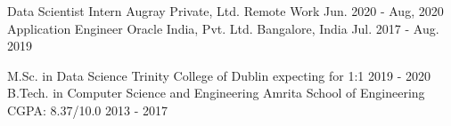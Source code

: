\documentclass[12pt, a4paper]{awesome-cv}
\begin{document}
\begin{cventries}
\cventry
    {Data Scientist Intern}
    {Augray Private, Ltd.}
    {Remote Work}
    {Jun. 2020 - Aug, 2020}
    {}
\cventry
    {Application Engineer}
    {Oracle India, Pvt. Ltd.}
    {Bangalore, India}
{Jul. 2017 - Aug. 2019}
    {}
\end{cventries}

\begin{cventries}
  \cventry
    {M.Sc. in Data Science}
    {Trinity College of Dublin}
    {expecting for 1:1}
    {2019 - 2020}
    {}
  \cventry
    {B.Tech. in Computer Science and Engineering}
    {Amrita School of Engineering}
    {CGPA: 8.37/10.0}
    {2013 - 2017}
    {}
\end{cventries}
\end{document}
